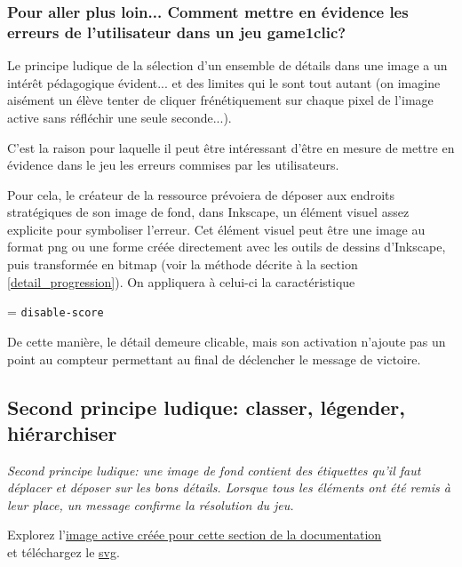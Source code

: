 {\subsubsection{Pour aller plus loin... Comment mettre en évidence les erreurs de l'utilisateur dans un jeu game1clic?}

Le principe ludique de la sélection d'un ensemble de détails dans une image a un intérêt pédagogique évident... 
et des limites qui le sont tout autant (on imagine aisément un élève tenter de cliquer frénétiquement sur chaque pixel 
de l'image active sans réfléchir une seule seconde...).

C'est la raison pour laquelle il peut être intéressant d'être en mesure de mettre en évidence dans le jeu les erreurs commises 
par les utilisateurs.

Pour cela, le créateur de la ressource prévoiera de déposer aux endroits stratégiques de son image de fond, dans Inkscape, 
un élément visuel assez explicite pour symboliser l'erreur. Cet élément visuel peut être une 
image au format png ou une forme créée directement avec les outils de dessins d'Inkscape, puis transformée en bitmap 
(voir la méthode décrite à la section \ref{detail_progression}). 
On appliquera à celui-ci la caractéristique
\begin{center}
 = \verb|disable-score| 
\end{center}
De cette manière, le détail demeure
clicable, mais son activation n'ajoute pas un point au compteur permettant au final de déclencher 
le message de victoire.

\subsection{Second principe ludique: classer, légender, hiérarchiser}

\textit{Second principe ludique: une image de fond contient des étiquettes qu'il faut déplacer et 
déposer sur les bons détails. Lorsque tous les éléments ont été remis à leur place, un message 
confirme la résolution du jeu.}

Explorez l'\href{http://geoffrey-gekiere.ac-versailles.fr/xia5}{image active créée pour cette section de la documentation} \\
et téléchargez le \href{http://geoffrey-gekiere.ac-versailles.fr/xia5/svg/xia5.svg}{svg}.

}
